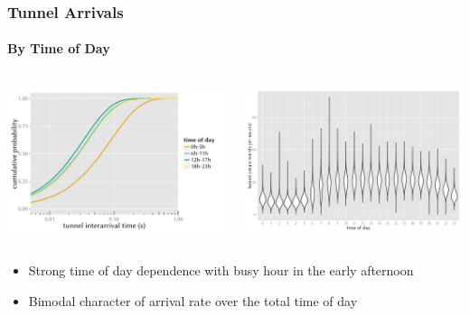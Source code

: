 \documentclass{beamer}
\begin{document}
\begin{frame}
	\frametitle{Tunnel Arrivals}
	\framesubtitle{By Time of Day}
	\begin{columns}[T]
			\includegraphics[width=1.0\columnwidth]{../../chapters/041-mobilenetsmeasuring/images/R-IAT-fromflows-ecdfs-2h.pdf}

			\includegraphics[width=1.0\columnwidth]{../../chapters/041-mobilenetsmeasuring/images/R-createspersecond-1h-violin.pdf}
	\end{columns}

	\begin{itemize}
		\item Strong time of day dependence with busy hour in the early afternoon
		\item Bimodal character of arrival rate over the total time of day
	\end{itemize}
\end{frame}
\end{document}
